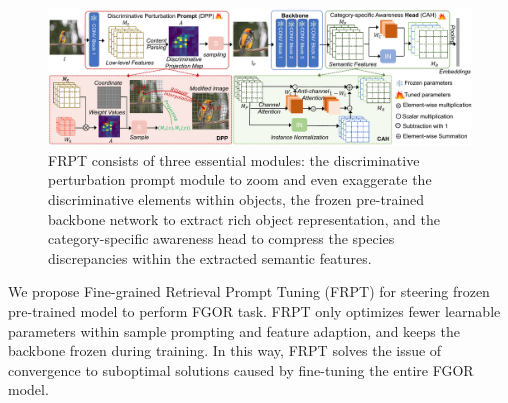 \documentclass[letterpaper]{article} %
\begin{document}
\begin{figure}[t]
\begin{center}
   \includegraphics[width=1\linewidth]{ap}
\end{center}
   \caption{FRPT consists of three essential modules: the discriminative perturbation prompt module to zoom and even exaggerate the discriminative elements within objects, the frozen pre-trained backbone network to extract rich object representation, and the category-specific awareness head to compress the species discrepancies within the extracted semantic features.}

\end{figure}



 
We propose Fine-grained Retrieval Prompt Tuning (FRPT) for steering frozen pre-trained model to perform FGOR task. FRPT only optimizes fewer learnable parameters within sample prompting and feature adaption, and keeps the backbone frozen during training. In this way, FRPT solves the issue of convergence to suboptimal solutions caused by fine-tuning the entire FGOR model.
\end{document}
